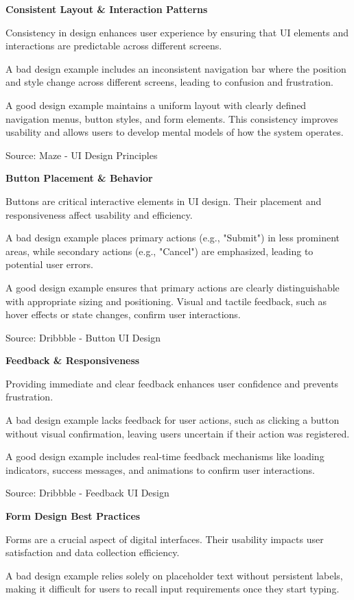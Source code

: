 \textbf{Consistent Layout \& Interaction Patterns}

Consistency in design enhances user experience by ensuring that UI elements and interactions are predictable across different screens.

A bad design example includes an inconsistent navigation bar where the position and style change across different screens, leading to confusion and frustration.

A good design example maintains a uniform layout with clearly defined navigation menus, button styles, and form elements. This consistency improves usability and allows users to develop mental models of how the system operates.

Source: Maze - UI Design Principles

\textbf{Button Placement \& Behavior}

Buttons are critical interactive elements in UI design. Their placement and responsiveness affect usability and efficiency.

A bad design example places primary actions (e.g., "Submit") in less prominent areas, while secondary actions (e.g., "Cancel") are emphasized, leading to potential user errors.

A good design example ensures that primary actions are clearly distinguishable with appropriate sizing and positioning. Visual and tactile feedback, such as hover effects or state changes, confirm user interactions.

Source: Dribbble - Button UI Design

\textbf{Feedback \& Responsiveness}

Providing immediate and clear feedback enhances user confidence and prevents frustration.

A bad design example lacks feedback for user actions, such as clicking a button without visual confirmation, leaving users uncertain if their action was registered.

A good design example includes real-time feedback mechanisms like loading indicators, success messages, and animations to confirm user interactions.

Source: Dribbble - Feedback UI Design

\textbf{Form Design Best Practices}

Forms are a crucial aspect of digital interfaces. Their usability impacts user satisfaction and data collection efficiency.

A bad design example relies solely on placeholder text without persistent labels, making it difficult for users to recall input requirements once they start typing.

